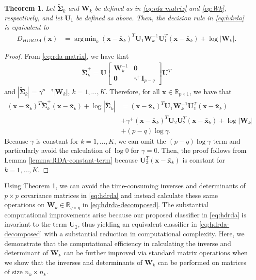 \documentclass[]{interact}\usepackage[]{graphicx}\usepackage[]{color}
\newcommand{\xbar}{\bar{\bm x}}
\DeclareMathOperator*{\argmin}{arg\,min}
\newtheorem{thm}{Theorem}
\begin{document}
\begin{thm}
Let $\tilde{\bm \Sigma}_k$ and $\bm W_k$ be defined as in \eqref{eq:rda-matrix}
and \eqref{eq:Wk}, respectively, and let $\bm U_1$ be defined as above. Then,
the decision rule in \eqref{eq:hdrda} is equivalent to
\begin{align}
		D_{HDRDA}(\bm x) &= \argmin_k  (\bm x - \xbar_k)^{T} \bm U_1 \bm W_k^{-1} \bm U_1^{T} (\bm x - \xbar_k) + \log | \bm W_k |. \label{eq:hdrda-decomposed}
\end{align}
\end{thm}
\begin{proof}
From \eqref{eq:rda-matrix}, we have that
\begin{align*}
  \tilde{\bm \Sigma}_k^{+} = \bm U \begin{bmatrix}
    \bm W_k^{-1} & \bm 0 \\
    \bm 0 & \gamma^{+} \bm I_{p-q}
  \end{bmatrix}
  \bm U^{T}
\end{align*}
and $|\tilde{\bm \Sigma}_k| = \gamma^{p-q}| \bm W_k |$, $k = 1, \ldots,
K$. Therefore, for all $\bm x \in \mathbb{R}_{p \times 1}$, we have that
\begin{align*}
	(\bm x - \xbar_k)^{T} \tilde{\bm \Sigma}_k^{+}(\bm x - \xbar_k)  + \log |\tilde{\bm \Sigma}_k| &= (\bm x - \xbar_k)^{T} \bm U_1 \bm W_k^{-1} \bm U_1^{T} (\bm x - \xbar_k)\\
	&+ \gamma^{+} (\bm x - \xbar_k)^{T} \bm U_2 \bm U_2^{T} (\bm x - \xbar_k) + \log | \bm W_k |\\
  &+ (p - q) \log \gamma.
\end{align*}
Because $\gamma$ is constant for $k = 1, \ldots, K$, we can omit the $(p - q)
\log \gamma$ term and particularly avoid the calculation of $\log 0$ for $\gamma
= 0$. Then, the proof follows from Lemma \ref{lemma:RDA-constant-term} because
$\bm U_2^{T} (\bm x - \xbar_k)$ is constant for $k = 1, \ldots, K$.
\end{proof}

Using Theorem 1, we can avoid the time-consuming inverses and determinants of $p
\times p$ covariance matrices in \eqref{eq:hdrda} and instead calculate these
same operations on $\bm W_k \in \mathbb{R}_{q \times q}$ in
\eqref{eq:hdrda-decomposed}. The substantial computational improvements arise
because our proposed classifier in \eqref{eq:hdrda} is invariant to the term
$\bm U_2$, thus yielding an equivalent classifier in \eqref{eq:hdrda-decomposed}
with a substantial reduction in computational complexity. Here, we demonstrate
that the computational efficiency in calculating the inverse and determinant of
$\bm W_k$ can be further improved via standard matrix operations when we show
that the inverses and determinants of $\bm W_k$ can be performed on matrices of
size $n_k \times n_k$.
\end{document}
